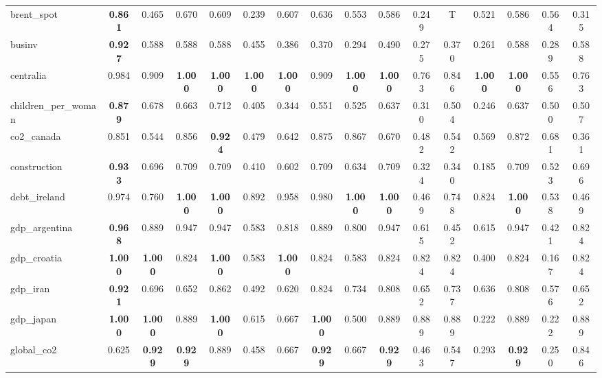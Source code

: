 \begin{table}
{\begin{tabular}{l|c|cccccccccccccc}
    brent\_spot & \textbf{0.861} & 0.465 & 0.670 & 0.609 & 0.239 & 0.607 & 0.636 & 0.553 & 0.586 & 0.249 & T & 0.521 & 0.586 & 0.564 & 0.315\\
    businv & \textbf{0.927} & 0.588 & 0.588 & 0.588 & 0.455 & 0.386 & 0.370 & 0.294 & 0.490 & 0.275 & 0.370 & 0.261 & 0.588 & 0.289 & 0.588\\
    centralia & 0.984 & 0.909 & \textbf{1.000} & \textbf{1.000} & \textbf{1.000} & \textbf{1.000} & 0.909 & \textbf{1.000} & \textbf{1.000} & 0.763 & 0.846 & \textbf{1.000} & \textbf{1.000} & 0.556 & 0.763\\
    children\_per\_woman & \textbf{0.879} & 0.678 & 0.663 & 0.712 & 0.405 & 0.344 & 0.551 & 0.525 & 0.637 & 0.310 & 0.504 & 0.246 & 0.637 & 0.500 & 0.507\\
    
    co2\_canada & 0.851 & 0.544 & 0.856 & \textbf{0.924} & 0.479 & 0.642 & 0.875 & 0.867 & 0.670 & 0.482 & 0.542 & 0.569 & 0.872 & 0.681 & 0.361\\
    
    construction & \textbf{0.933} & 0.696 & 0.709 & 0.709 & 0.410 & 0.602 & 0.709 & 0.634 & 0.709 & 0.324 & 0.340 & 0.185 & 0.709 & 0.523 & 0.696\\
    
    debt\_ireland & 0.974 & 0.760 & \textbf{1.000} & \textbf{1.000} & 0.892 & 0.958 & 0.980 & \textbf{1.000} & \textbf{1.000} & 0.469 & 0.748 & 0.824 & \textbf{1.000} & 0.538 & 0.469\\
    
    gdp\_argentina & \textbf{0.968} & 0.889 & 0.947 & 0.947 & 0.583 & 0.818 & 0.889 & 0.800 & 0.947 & 0.615 & 0.452 & 0.615 & 0.947 & 0.421 & 0.824\\
    
    gdp\_croatia & \textbf{1.000} & \textbf{1.000} & 0.824 & \textbf{1.000} & 0.583 & \textbf{1.000} & 0.824 & 0.583 & 0.824 & 0.824 & 0.824 & 0.400 & 0.824 & 0.167 & 0.824\\
    
    gdp\_iran & \textbf{0.921} & 0.696 & 0.652 & 0.862 & 0.492 & 0.620 & 0.824 & 0.734 & 0.808 & 0.652 & 0.737 & 0.636 & 0.808 & 0.576 & 0.652\\
    
    gdp\_japan & \textbf{1.000} & \textbf{1.000} & 0.889 & \textbf{1.000} & 0.615 & 0.667 & \textbf{1.000} & 0.500 & 0.889 & 0.889 & 0.889 & 0.222 & 0.889 & 0.222 & 0.889\\
    
    global\_co2 & 0.625 & \textbf{0.929} & \textbf{0.929} & 0.889 & 0.458 & 0.667 & \textbf{0.929} & 0.667 & \textbf{0.929} & 0.463 & 0.547 & 0.293 & \textbf{0.929} & 0.250 & 0.846\\
    

\end{tabular}}
\end{table}
